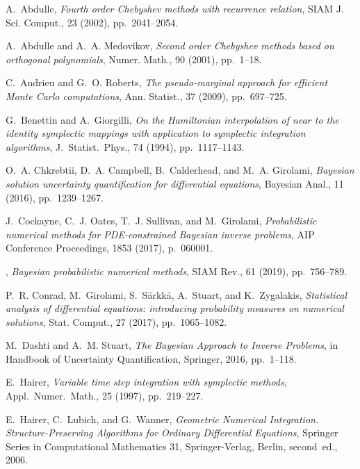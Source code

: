 \documentclass[10pt]{article}
\begin{document}
\def\cprime{$'$}
\begin{thebibliography}{10}
	
	{\sc A.~Abdulle}, {\em Fourth order {C}hebyshev methods with recurrence
		relation}, SIAM J. Sci. Comput., 23 (2002), pp.~2041--2054.
	
	{\sc A.~Abdulle and A.~A. Medovikov}, {\em Second order {C}hebyshev methods
		based on orthogonal polynomials}, Numer. Math., 90 (2001), pp.~1--18.
	
	{\sc C.~Andrieu and G.~O. Roberts}, {\em The pseudo-marginal approach for
		efficient {M}onte {C}arlo computations}, Ann. Statist., 37 (2009),
	pp.~697--725.
	
	{\sc G.~Benettin and A.~Giorgilli}, {\em On the {H}amiltonian interpolation of
		near to the identity symplectic mappings with application to symplectic
		integration algorithms}, J.\ Statist.\ Phys., 74 (1994), pp.~1117--1143.
	
	{\sc O.~A. Chkrebtii, D.~A. Campbell, B.~Calderhead, and M.~A. Girolami}, {\em
		Bayesian solution uncertainty quantification for differential equations},
	Bayesian Anal., 11 (2016), pp.~1239--1267.
	
	{\sc J.~Cockayne, C.~J. Oates, T.~J. Sullivan, and M.~Girolami}, {\em
		Probabilistic numerical methods for {PDE}-constrained {B}ayesian inverse
		problems}, AIP Conference Proceedings, 1853 (2017), p.~060001.
	
	\leavevmode\vrule height 2pt depth -1.6pt width 23pt, {\em Bayesian
		probabilistic numerical methods}, SIAM Rev., 61 (2019), pp.~756--789.
	
	{\sc P.~R. Conrad, M.~Girolami, S.~S\"{a}rkk\"{a}, A.~Stuart, and
		K.~Zygalakis}, {\em Statistical analysis of differential equations:
		introducing probability measures on numerical solutions}, Stat. Comput., 27
	(2017), pp.~1065--1082.
	
	{\sc M.~Dashti and A.~M. Stuart}, {\em The {B}ayesian {A}pproach to {I}nverse
		{P}roblems}, in Handbook of Uncertainty Quantification, Springer, 2016,
	pp.~1--118.
	
	{\sc E.~Hairer}, {\em Variable time step integration with symplectic methods},
	Appl.\ Numer.\ Math., 25 (1997), pp.~219--227.
	
	{\sc E.~Hairer, C.~Lubich, and G.~Wanner}, {\em Geometric Numerical
		Integration. Structure-Preserving Algorithms for Ordinary Differential
		Equations}, Springer Series in Computational Mathematics 31, Springer-Verlag,
	Berlin, second~ed., 2006.
	

\end{thebibliography}
\end{document}
